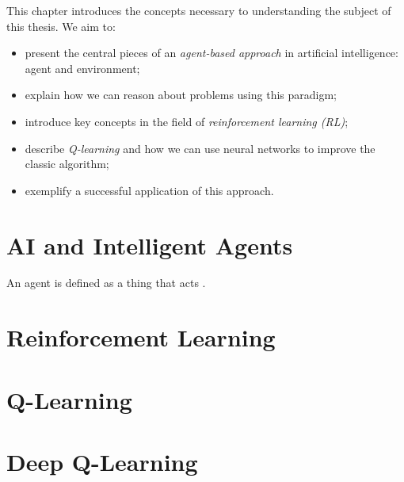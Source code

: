 This chapter introduces the concepts necessary to understanding the subject of this thesis. We aim to:
\begin{itemize}
    \item present the central pieces of an \emph{agent-based approach} in artificial intelligence: agent and environment;
    \item explain how we can reason about problems using this paradigm;
    \item introduce key concepts in the field of \emph{reinforcement learning (RL)};
    \item describe \emph{Q-learning} and how we can use neural networks to improve the classic algorithm;
    \item exemplify a successful application of this approach.
\end{itemize}

\section{AI and Intelligent Agents}
An agent is defined as a {thing that acts} \cite{aima}.

\section{Reinforcement Learning}

\section{Q-Learning}


\section{Deep Q-Learning}



